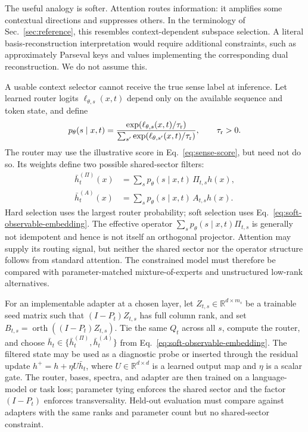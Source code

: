 \documentclass[
  aps,
  reprint,
  superscriptaddress,
  floatfix,
  nofootinbib,
  longbibliography
]{revtex4-2}
\newcommand{\R}{\mathbb{R}}
\begin{document}
The useful analogy is softer. Attention routes information: it amplifies
some contextual directions and suppresses others. In the terminology of
Sec.~\ref{sec:reference}, this resembles context-dependent subspace
selection. A literal basis-reconstruction interpretation would require
additional constraints, such as approximately Parseval keys and values
implementing the corresponding dual reconstruction. We do not assume this.

A usable context selector cannot receive the true sense label at inference.
Let learned router logits $\ell_{\theta,s}(x,t)$ depend only on the available
sequence and token state, and define
%
\begin{equation}
\label{eq:context-temp}
p_\theta(s\mid x,t)=
\frac{\exp(\ell_{\theta,s}(x,t)/\tau_{\rm r})}
{\sum_{s'}\exp(\ell_{\theta,s'}(x,t)/\tau_{\rm r})},
\qquad \tau_{\rm r}>0 .
\end{equation}
%
The router may use the illustrative score in Eq.~\eqref{eq:sense-score}, but
need not do so.  Its weights define two possible shared-sector filters:
%
\begin{equation}
\label{eq:soft-observable-embedding}
\begin{aligned}
\bar h_t^{(\Pi)}(x)
&=\sum_s p_\theta(s\mid x,t)\,\Pi_{t,s}h(x),\\
\bar h_t^{(A)}(x)
&=\sum_s p_\theta(s\mid x,t)\,A_{t,s}h(x).
\end{aligned}
\end{equation}
%
Hard selection uses the largest router probability; soft selection uses
Eq.~\eqref{eq:soft-observable-embedding}.  The effective operator
$\sum_s p_\theta(s\mid x,t)\Pi_{t,s}$ is generally not idempotent and hence is
not itself an orthogonal projector.  Attention may supply its routing signal,
but neither the shared sector nor the operator structure follows from standard
attention.  The constrained model must therefore be compared with
parameter-matched mixture-of-experts and unstructured low-rank alternatives.

For an implementable adapter at a chosen layer, let
$Z_{t,s}\in\R^{d\times m_s}$ be a trainable seed matrix such that
$(I-P_t)Z_{t,s}$ has full column rank, and set
$B_{t,s}=\operatorname{orth}((I-P_t)Z_{t,s})$.  Tie the same $Q_t$ across all
$s$, compute the router, and choose
$\bar h_t\in\{\bar h_t^{(\Pi)},\bar h_t^{(A)}\}$ from
Eq.~\eqref{eq:soft-observable-embedding}.  The filtered state may be used as a
diagnostic probe or inserted through the residual update
$h^+=h+\eta U\bar h_t$, where $U\in\R^{d\times d}$ is a learned output map and
$\eta$ is a scalar gate.  The router, bases, spectra, and adapter are then trained on a
language-model or task loss; parameter tying enforces the shared sector and
the factor $(I-P_t)$ enforces transversality.  Held-out evaluation must compare
against adapters with the same ranks and parameter count but no shared-sector
constraint.
\end{document}
